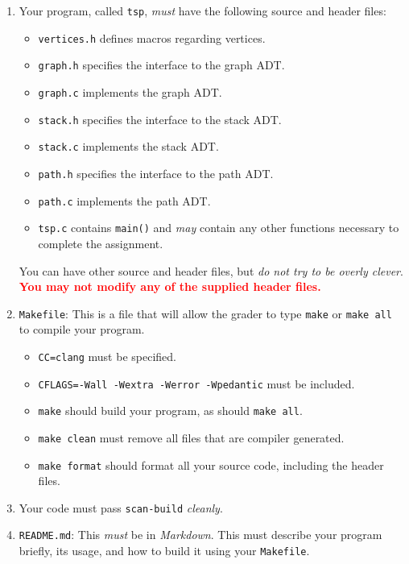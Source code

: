 \documentclass[11pt]{article}
\begin{document}
\begin{enumerate}
  \item Your program, called \texttt{tsp}, \emph{must} have the
    following source and header files:
    \begin{itemize}
      \item \texttt{vertices.h} defines macros regarding vertices.
      \item \texttt{graph.h} specifies the interface to the graph ADT.
      \item \texttt{graph.c} implements the graph ADT.
      \item \texttt{stack.h} specifies the interface to the stack ADT.
      \item \texttt{stack.c} implements the stack ADT.
      \item \texttt{path.h} specifies the interface to the path ADT.
      \item \texttt{path.c} implements the path ADT.
      \item \texttt{tsp.c} contains \texttt{main()} and \emph{may}
        contain any other functions necessary to complete the
        assignment.
    \end{itemize}

You can have other source and header files, but \emph{do not try to be
overly clever}. \textbf{\textcolor{red}{You may not modify any of the supplied
header files.}}

  \item \texttt{Makefile}: This is a file that will allow the grader to
    type \texttt{make} or \texttt{make all} to compile your program.
    \begin{itemize}
      \item \texttt{CC=clang} must be specified.
      \item \texttt{CFLAGS=-Wall -Wextra -Werror -Wpedantic}
        must be included.
      \item \texttt{make} should build your program, as should
        \texttt{make all}.
      \item \texttt{make clean} must remove all files that are compiler
        generated.
      \item \texttt{make format} should format all your source code,
        including the header files.
    \end{itemize}

  \item Your code must pass \texttt{scan-build} \emph{cleanly}.

  \item \texttt{README.md}: This \emph{must} be in \emph{Markdown}.
    This must describe your program briefly, its usage, and how to build
    it using your \texttt{Makefile}.


\end{enumerate}
\end{document}
